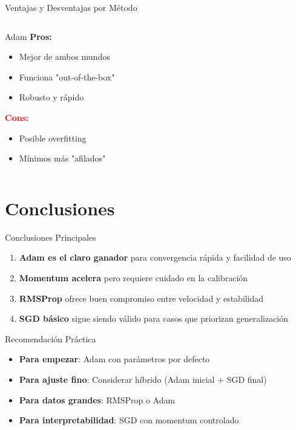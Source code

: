 \documentclass[10pt]{beamer}
\begin{document}
\begin{frame}{Ventajas y Desventajas por Método}
\begin{columns}
\begin{column}{0.5\textwidth}
\begin{block}{Adam}
\textcolor{verdeClaro}{\textbf{Pros:}}
\begin{itemize}
\item Mejor de ambos mundos
\item Funciona "out-of-the-box"
\item Robusto y rápido
\end{itemize}
\textcolor{red}{\textbf{Cons:}}
\begin{itemize}
\item Posible overfitting
\item Mínimos más "afilados"
\end{itemize}
\end{block}
\end{column}
\end{columns}
\end{frame}

\section{Conclusiones}

\begin{frame}{Conclusiones Principales}
\begin{enumerate}
\item \textbf{Adam es el claro ganador} para convergencia rápida y facilidad de uso
\item \textbf{Momentum acelera} pero requiere cuidado en la calibración
\item \textbf{RMSProp} ofrece buen compromiso entre velocidad y estabilidad
\item \textbf{SGD básico} sigue siendo válido para casos que priorizan generalización
\end{enumerate}

\begin{alertblock}{Recomendación Práctica}
\begin{itemize}
\item \textbf{Para empezar}: Adam con parámetros por defecto
\item \textbf{Para ajuste fino}: Considerar híbrido (Adam inicial + SGD final)
\item \textbf{Para datos grandes}: RMSProp o Adam
\item \textbf{Para interpretabilidad}: SGD con momentum controlado
\end{itemize}
\end{alertblock}
\end{frame}
\end{document}
